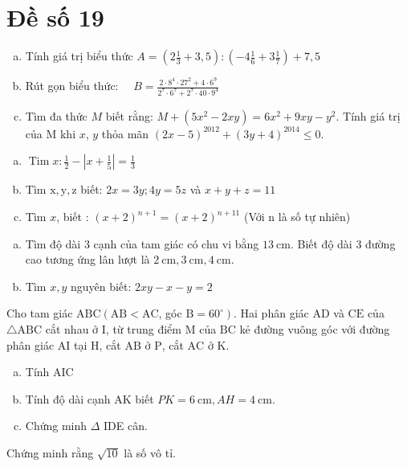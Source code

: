 \onehalfspacing
\section{Đề số 19}

\begin{bt} 
    \hfil
    \begin{enumerate}[a.]
        \item Tính giá trị biểu thức $A=\left(2 \frac{1}{3}+3,5\right):\left(-4 \frac{1}{6}+3 \frac{1}{7}\right)+7,5$
        \item Rút gọn biểu thức: $\quad B=\frac{2 \cdot 8^4 \cdot 27^2+4 \cdot 6^9}{2^7 \cdot 6^7+2^7 \cdot 40 \cdot 9^4}$
        \item Tìm đa thức $M$ biết rằng: $M+\left(5 x^2-2 x y\right)=6 x^2+9 x y-y^2$.
        Tính giá trị của M khi $x$, $y$ thỏa mãn $(2 x-5)^{2012}+(3 y+4)^{2014} \leq 0$.
    \end{enumerate}
\loigiai{}
\end{bt}

\begin{bt}
    \hfill
	\begin{enumerate}[a.]
        \item $\operatorname{Tim} x: \frac{1}{2}-\left|x+\frac{1}{5}\right|=\frac{1}{3}$
        \item Tìm $\mathrm{x}, \mathrm{y}, \mathrm{z}$ biết: $2 x=3 y ; 4 y=5 z$ và $x+y+z=11$
        \item Tìm $x$, biết : $(x+2)^{n+1}=(x+2)^{n+11}$ (Với $\mathrm{n}$ là số tự nhiên)
    \end{enumerate}
	\loigiai{} 
\end{bt}

\begin{bt}
    \hfill
	\begin{enumerate}[a.]
        \item Tìm độ dài 3 cạnh của tam giác có chu vi bằng $13 \mathrm{~cm}$. Biết độ dài 3 đường cao tương ứng lân lượt là $2 \mathrm{~cm}, 3 \mathrm{~cm}, 4 \mathrm{~cm}$.
        \item Tìm $x, y$ nguyên biết: $2 x y-x-y=2$
    \end{enumerate}
	\loigiai{}
\end{bt}

\begin{bt}
    Cho tam giác $\mathrm{ABC}\left(\mathrm{AB}<\mathrm{AC}\right.$, góc $\left.\mathrm{B}=60^{\circ}\right)$. Hai phân giác $\mathrm{AD}$ và $\mathrm{CE}$ của $\triangle \mathrm{ABC}$ cắt nhau ở $\mathrm{I}$, từ trung điểm $\mathrm{M}$ của $\mathrm{BC}$ kẻ đường vuông góc với đường phân giác $\mathrm{AI}$ tại $\mathrm{H}$, cắt $\mathrm{AB}$ ở $\mathrm{P}$, cắt $\mathrm{AC}$ ở $\mathrm{K}$.
    \begin{enumerate}[a.]
        \item  Tính AIC
        \item Tính độ dài cạnh $\mathrm{AK}$ biết $P K=6 \mathrm{~cm}, A H=4 \mathrm{~cm}$.
        \item Chứng minh $\Delta$ IDE cân.
    \end{enumerate}
\loigiai{}
\end{bt}

\begin{bt}
    Chứng minh rằng $\sqrt{10}$ là số vô tỉ.
\loigiai{}
\end{bt}

